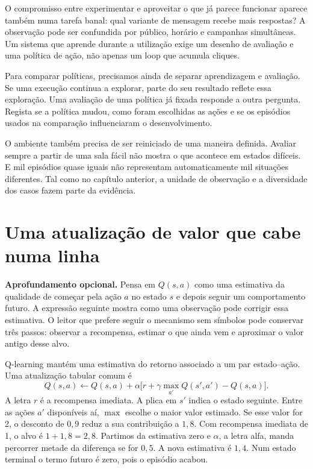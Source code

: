 O compromisso entre experimentar e aproveitar o que já parece funcionar aparece também numa tarefa banal: qual variante de mensagem recebe mais respostas? A observação pode ser confundida por público, horário e campanhas simultâneas. Um sistema que aprende durante a utilização exige um desenho de avaliação e uma política de ação, não apenas um loop que acumula cliques.

Para comparar políticas, precisamos ainda de separar aprendizagem e avaliação. Se uma execução continua a explorar, parte do seu resultado reflete essa exploração. Uma avaliação de uma política já fixada responde a outra pergunta. Regista se a política mudou, como foram escolhidas as ações e se os episódios usados na comparação influenciaram o desenvolvimento.

O ambiente também precisa de ser reiniciado de uma maneira definida. Avaliar sempre a partir de uma sala fácil não mostra o que acontece em estados difíceis. E mil episódios quase iguais não representam automaticamente mil situações diferentes. Tal como no capítulo anterior, a unidade de observação e a diversidade dos casos fazem parte da evidência.

\section{Uma atualização de valor que cabe numa linha}
\textbf{Aprofundamento opcional.} Pensa em $Q(s,a)$ como uma estimativa da qualidade de começar pela ação $a$ no estado $s$ e depois seguir um comportamento futuro. A expressão seguinte mostra como uma observação pode corrigir essa estimativa. O leitor que prefere seguir o mecanismo sem símbolos pode conservar três passos: observar a recompensa, estimar o que ainda vem e aproximar o valor antigo desse alvo.

Q-learning mantém uma estimativa do retorno associado a um par estado--ação. Uma atualização tabular comum é
\[
Q(s,a)\leftarrow Q(s,a)+\alpha\bigl[r+\gamma\max_{a'}Q(s',a')-Q(s,a)\bigr].
\]
A letra $r$ é a recompensa imediata. A plica em $s'$ indica o estado seguinte. Entre as ações $a'$ disponíveis aí, $\max$ escolhe o maior valor estimado. Se esse valor for 2, o desconto de $0{,}9$ reduz a sua contribuição a $1{,}8$. Com recompensa imediata de 1, o alvo é $1+1{,}8=2{,}8$. Partimos da estimativa zero e $\alpha$, a letra alfa, manda percorrer metade da diferença se for $0{,}5$. A nova estimativa é $1{,}4$. Num estado terminal o termo futuro é zero, pois o episódio acabou.

